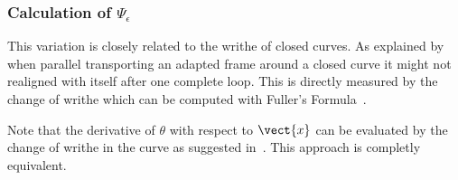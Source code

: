 \subsubsection{Calculation of $\Psi_\epsilon$}

This variation is closely related to the writhe of closed curves. As explained by  when parallel transporting an adapted frame around a closed curve it might not realigned with itself after one complete loop. This  is directly measured by the change of writhe which can be computed with Fuller's Formula~\cite{Fuller1978}.

Note that the derivative of $\theta$ with respect to $\vect{x}$ can be evaluated by the change of writhe in the curve as suggested in~\cite{deVries2005}. This approach is completly equivalent.

